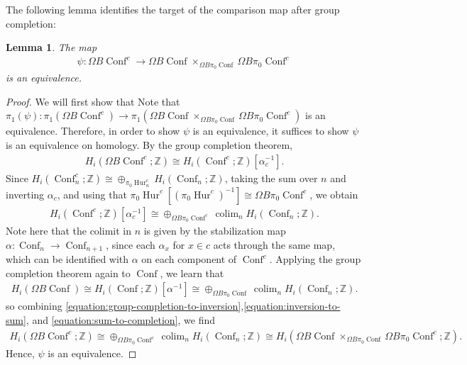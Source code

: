 \documentclass[12 pt]{amsart}
\theoremstyle{plain}
\newtheorem{lemma}[theorem]{Lemma}
\theoremstyle{definition}
\newtheorem{remark}[theorem]{Remark}
\theoremstyle{remark}
\numberwithin{equation}{section}
\DeclareMathOperator\Hur{Hur}
\DeclareMathOperator\Conf{Conf}
\newcommand\ZZ{\mathbb{Z}}
\DeclareMathOperator\conf{Conf}
\DeclareMathOperator\colim{colim}
\begin{document}
The following lemma identifies the target of the comparison map after group completion:
\begin{lemma}\label{lemma:targetgroupcompletion}
	The map
	\begin{align}
		\label{equation:psi-definition}
		\psi:	\Omega B\Conf^{c} \to
		\Omega B\Conf \times_{\Omega B\pi_0\Conf}\Omega
		B\pi_0\Conf^{c}
	\end{align}
	is an equivalence. 
\end{lemma}

\begin{proof}
	We will first show that 
	Note that $\pi_1(\psi) : \pi_1(\Omega B\Conf^{c}) \to
	\pi_1(\Omega B\Conf \times_{\Omega B\pi_0\Conf}\Omega
	B\pi_0\Conf^{c})$
	is an equivalence. Therefore, in order to show $\psi$ is an equivalence,
	it suffices to show $\psi$
	is an equivalence on homology.
	By the group completion theorem, 
	\begin{align}
		\label{equation:group-completion-to-inversion}
		H_i(\Omega B\Conf^{c};\mathbb Z) \cong
		H_i(\Conf^c;\mathbb Z)[\alpha_c^{-1}].
	\end{align}
	Since $H_i(\Conf^c_n;\mathbb Z) \cong \oplus_{\pi_0
		\Hur^c_n} H_i(\conf_n;\mathbb Z)$,
	taking the sum over $n$ and inverting $\alpha_c$, 
	and using that $\pi_0
	\Hur^c[(\pi_0\Hur^c)^{-1}] \cong \Omega B \pi_0\Conf^c$, we obtain
	\begin{align}
		\label{equation:inversion-to-sum}
		H_i(\Conf^c;\mathbb Z)[\alpha_c^{-1}] \cong \oplus_{\Omega
			B\pi_0\Conf^c} \colim_n H_i(\conf_n;\mathbb Z).
	\end{align}
	Note here that the colimit in $n$ is given by the stabilization map
	$\alpha:\Conf_n \to \Conf_{n+1}$, since each $\alpha_x$ for $x \in c$ acts
	through the same map, which can be identified with $\alpha$ on each component
	of $\Conf^c$.
	Applying the group completion theorem again to $\Conf$, we learn that
	\begin{align}
		\label{equation:sum-to-completion}
		H_i(\Omega B\Conf) \cong 	H_i(\Conf;\ZZ)[\alpha^{-1}] \cong \oplus_{\Omega B \pi_0 \Conf}\colim_n H_i(\conf_n;\mathbb Z).
	\end{align}
	so combining
	\eqref{equation:group-completion-to-inversion},\eqref{equation:inversion-to-sum},
	and \eqref{equation:sum-to-completion}, we find
	\begin{align*}
		H_i(\Omega B\Conf^c;\ZZ) \cong \oplus_{\Omega B\pi_0\Conf^c} \colim_n H_i(\conf_n;\mathbb Z) 
		\cong 
		H_i(\Omega B\Conf \times_{\Omega B\pi_0\Conf}\Omega
		B\pi_0\Conf^{c};\mathbb Z).
	\end{align*}
	Hence, $\psi$ is an equivalence.
\end{proof}
\end{document}
